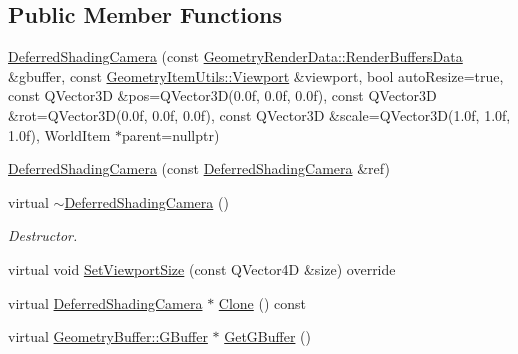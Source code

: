 \subsection*{Public Member Functions}
\begin{DoxyCompactItemize}
\item 
\mbox{\hyperlink{class_geometry_engine_1_1_geometry_world_item_1_1_geometry_camera_1_1_deferred_shading_camera_a2905780ad7d5fc6046cc2d64e82ec1bd}{Deferred\+Shading\+Camera}} (const \mbox{\hyperlink{class_geometry_engine_1_1_geometry_render_data_1_1_render_buffers_data}{Geometry\+Render\+Data\+::\+Render\+Buffers\+Data}} \&gbuffer, const \mbox{\hyperlink{class_geometry_engine_1_1_geometry_item_utils_1_1_viewport}{Geometry\+Item\+Utils\+::\+Viewport}} \&viewport, bool auto\+Resize=true, const Q\+Vector3D \&pos=Q\+Vector3D(0.\+0f, 0.\+0f, 0.\+0f), const Q\+Vector3\+D \&rot=\+Q\+Vector3\+D(0.\+0f, 0.\+0f, 0.\+0f), const Q\+Vector3\+D \&scale=\+Q\+Vector3\+D(1.\+0f, 1.\+0f, 1.\+0f), World\+Item $\ast$parent=nullptr)
\item 
\mbox{\hyperlink{class_geometry_engine_1_1_geometry_world_item_1_1_geometry_camera_1_1_deferred_shading_camera_a3fddaea07dd897fe83081ff45cf99416}{Deferred\+Shading\+Camera}} (const \mbox{\hyperlink{class_geometry_engine_1_1_geometry_world_item_1_1_geometry_camera_1_1_deferred_shading_camera}{Deferred\+Shading\+Camera}} \&ref)
\item 
\mbox{\label{class_geometry_engine_1_1_geometry_world_item_1_1_geometry_camera_1_1_deferred_shading_camera_ae5eb53c675d8a7ad9070853f4b5d4951}} 
virtual \mbox{\hyperlink{class_geometry_engine_1_1_geometry_world_item_1_1_geometry_camera_1_1_deferred_shading_camera_ae5eb53c675d8a7ad9070853f4b5d4951}{$\sim$\+Deferred\+Shading\+Camera}} ()
\begin{DoxyCompactList}\small\item\em Destructor. \end{DoxyCompactList}\item 
virtual void \mbox{\hyperlink{class_geometry_engine_1_1_geometry_world_item_1_1_geometry_camera_1_1_deferred_shading_camera_a16da38cfd723b755a63c372c08bbedf7}{Set\+Viewport\+Size}} (const Q\+Vector4D \&size) override
\item 
virtual \mbox{\hyperlink{class_geometry_engine_1_1_geometry_world_item_1_1_geometry_camera_1_1_deferred_shading_camera}{Deferred\+Shading\+Camera}} $\ast$ \mbox{\hyperlink{class_geometry_engine_1_1_geometry_world_item_1_1_geometry_camera_1_1_deferred_shading_camera_ac020fe14bc32f3fdbd0c9423af1c975f}{Clone}} () const
\item 
virtual \mbox{\hyperlink{class_geometry_engine_1_1_geometry_buffer_1_1_g_buffer}{Geometry\+Buffer\+::\+G\+Buffer}} $\ast$ \mbox{\hyperlink{class_geometry_engine_1_1_geometry_world_item_1_1_geometry_camera_1_1_deferred_shading_camera_aa37bfbf062ca20f0d41d5f29fbbc7959}{Get\+G\+Buffer}} ()
\end{DoxyCompactItemize}
